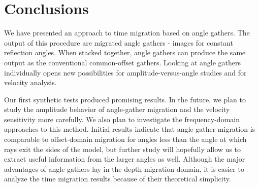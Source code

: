 \section{Conclusions}

We have presented an approach to time migration based on angle
gathers. The output of this procedure are migrated angle gathers -
images for constant reflection angles. When stacked together, angle
gathers can produce the same output as the conventional common-offset
gathers. Looking at angle gathers individually opens new possibilities
for amplitude-versus-angle studies and for velocity analysis. 
\par
Our first synthetic tests produced promising results. In the future,
we plan to study the amplitude behavior of angle-gather migration and the
velocity sensitivity more carefully. We also plan to investigate 
the frequency-domain approaches to this method. Initial results indicate
that angle-gather migration is comparable to offset-domain migration for
angles less than the angle at which rays exit the sides of the model, but
further study will hopefully allow us to extract useful information from 
the larger angles as well. Although the major advantages of angle gathers 
lay in the depth migration domain, it is easier to analyze the time migration 
results because of their theoretical simplicity.






%
%
